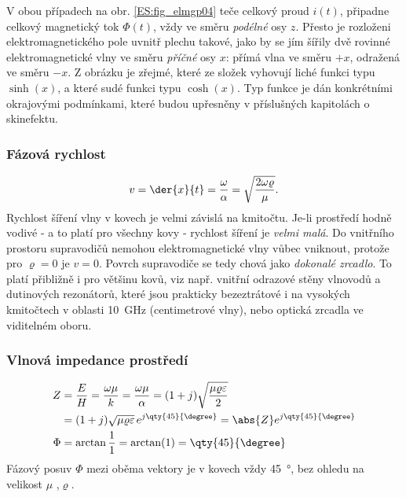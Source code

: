         V obou případech na obr. \ref{ES:fig_elmgp04} teče celkový proud \(i(t)\), připadne celkový 
        magnetický tok \(\Phi(t)\), vždy ve směru \emph{podélné} osy \(z\). Přesto je rozloženi 
        elektromagnetického pole uvnitř plechu takové, jako by se jím šířily dvě rovinné 
        elektromagnetické vlny ve směru \emph{příčné} osy \(x\): přímá vlna ve směru \(+x\), 
        odražená ve směru \(-x\). Z obrázku je zřejmé, které ze složek vyhovují liché funkci typu 
        \(
        \sinh(x)\), a které sudé funkci typu \(\cosh(x)\). Typ funkce je dán konkrétními okrajovými 
        podmínkami, které budou upřesněny v příslušných kapitolách o skinefektu.
       
        \subsubsection{Fázová rychlost}
          \begin{equation}\label{ES:eq_elmagp51}
            v = \der{x}{t} = \frac{\omega}{\alpha} 
              = \sqrt{\dfrac{2\omega\varrho}{\mu}}.
          \end{equation}
          Rychlost šíření vlny v kovech je velmi závislá na kmitočtu. Je-li prostředí hodně 
          vodivé - a to platí pro všechny kovy - rychlost šíření je \emph{velmi malá}. Do vnitřního 
          prostoru supravodičů nemohou elektromagnetické vlny vůbec vniknout, protože pro \(\varrho 
          = 0\) je \(v = 0\). Povrch supravodiče se tedy chová jako \emph{dokonalé zrcadlo}. To 
          platí přibližně i pro většinu kovů, viz např. vnitřní odrazové stěny vlnovodů a 
          dutinových rezonátorů, které jsou prakticky bezeztrátové i na vysokých kmitočtech v 
          oblasti \qty{10}{\GHz} (centimetrové vlny), nebo optická zrcadla ve viditelném oboru.

        \subsubsection{Vlnová impedance prostředí}
          \begin{subequations}
            \begin{align}
                Z &= \frac{E}{H} = \frac{\omega\mu}{k} 
                   = \frac{\omega\mu}{\alpha} 
                   = (1+j)\sqrt{\frac{\mu\varrho\varepsilon}{2}}                      \nonumber \\
                  &= (1+j)\sqrt{\mu\varrho\varepsilon}\,e^{j\qty{45}{\degree}}         
                   =  \abs{Z}e^{j\qty{45}{\degree}}                      \label{ES:eq_elmagp51a} \\
             \Phi &= \arctan\frac{1}{1} 
                   = \arctan(1) 
                   = \qty{45}{\degree}                                   \label{ES:eq_elmagp51b} 
            \end{align}
          \end{subequations}
          Fázový posuv \(\Phi\) mezi oběma vektory je v kovech vždy \qty{45}{\degree}, bez ohledu na 
          velikost \(\mu\) ,\(\varrho\).
          
